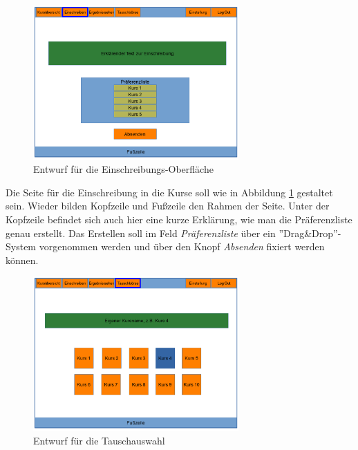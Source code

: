             \begin{figure}[t]
            	\centering
            	\includegraphics[width=0.7\textwidth]{./design/MockUpsFrontend/frontendPreferences.png}
            	\caption{Entwurf für die Einschreibungs-Oberfläche}
            	\label{mockupPreferencesFrontend}
            \end{figure}
            
            Die Seite für die Einschreibung in die Kurse soll wie in Abbildung \ref{mockupPreferencesFrontend} gestaltet sein.
            Wieder bilden Kopfzeile und Fußzeile den Rahmen der Seite.
            Unter der Kopfzeile befindet sich auch hier eine kurze Erklärung, wie man die Präferenzliste genau erstellt.
            Das Erstellen soll im Feld \textit{Präferenzliste} über ein ''Drag\&Drop''-System vorgenommen werden und über den Knopf \textit{Absenden} fixiert werden können.
            
            \begin{figure}[t]
                \centering
                \includegraphics[width=0.7\textwidth]{./design/MockUpsFrontend/frontendSwap1.png}
                \caption{Entwurf für die Tauschauswahl}
                \label{mockupResultsFrontend}
            \end{figure}
        
